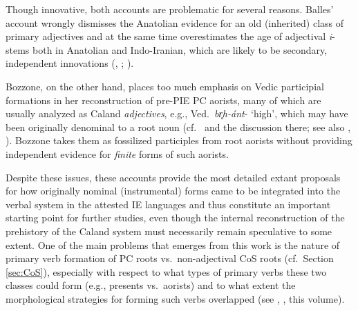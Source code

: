 \documentclass[output=paper,colorlinks,citecolor=brown]{langscibook}
\begin{document}
Though innovative, both accounts are problematic for several reasons. Balles' account wrongly dismisses the Anatolian evidence for an old (inherited) class of primary  adjectives and at the same time overestimates the age of adjectival \textit{i}-stems both in Anatolian and Indo-Iranian, which are likely to be secondary, independent innovations (\citealt[8--10]{Grestenberger2009}, \citeyear[99]{Grestenberger2014}; \citealt[316]{Pinault2018}).

Bozzone, on the other hand, places too much emphasis on Vedic participial formations in her reconstruction of pre-PIE PC aorists, many of which are usually analyzed as Caland \emph{adjectives},  e.g., Ved.\ \textit{br̥h-ánt}-  `high', which may have been originally denominal  to a root noun (cf.\  and the discussion there; see also \citealt{Lowe2012}, \citeyear[283--294]{Lowe2015}). Bozzone takes them as fossilized participles from root aorists without providing independent evidence for \emph{finite} forms of such aorists.  

Despite these issues, these accounts provide the most detailed extant proposals for how originally nominal (instrumental) forms came to be integrated into the verbal system in the attested IE languages and thus constitute an important starting point for further studies, even though the internal reconstruction of the prehistory of the Caland system  must necessarily remain speculative to some extent. One of the main problems that emerges from this work is the nature of primary verb formation  of PC roots vs.\ non-adjectival CoS  roots   (cf.\ Section \ref{sec:CoS}), especially with respect to what types of primary verbs  these two classes could form (e.g., presents vs.\ aorists) and to what extent the morphological strategies for forming such verbs overlapped (see \citealt{Rau2009}, \citealt{Rau2013}, this volume).  %
\end{document}

